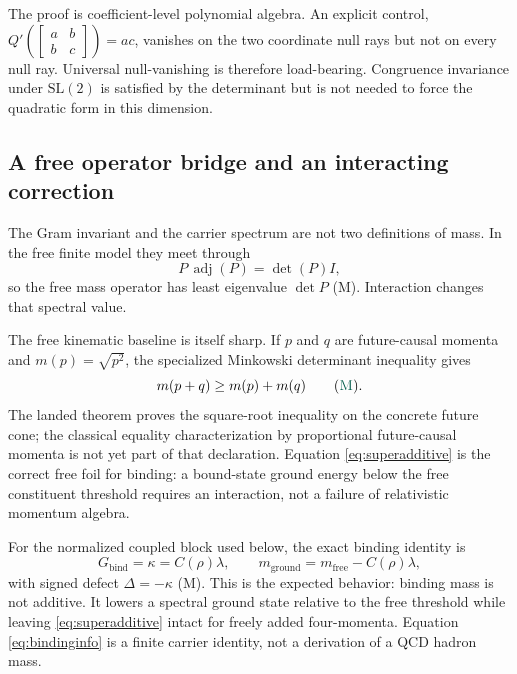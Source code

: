 \documentclass[11pt]{article}
\newcommand{\Mtag}{\textcolor{verified}{\textsc{M}}}
\begin{document}
The proof is coefficient-level polynomial algebra.  An explicit control,
$Q'(\left[\begin{smallmatrix}a&b\\b&c\end{smallmatrix}\right])=ac$, vanishes on
the two coordinate null rays but not on every null ray.  Universal
null-vanishing is therefore load-bearing.  Congruence invariance under
$\mathrm{SL}(2)$ is satisfied by the determinant but is not needed to force the
quadratic form in this dimension.

\subsection{A free operator bridge and an interacting correction}

The Gram invariant and the carrier spectrum are not two definitions of mass.
In the free finite model they meet through
\begin{equation}\label{eq:adjbridge}
  P\,\operatorname{adj}(P)=\det(P)I,
\end{equation}
so the free mass operator has least eigenvalue $\det P$ (\Mtag).  Interaction
changes that spectral value.

The free kinematic baseline is itself sharp.  If $p$ and $q$ are
future-causal momenta and $m(p)=\sqrt{p^2}$, the specialized Minkowski
determinant inequality gives
\begin{equation}\label{eq:superadditive}
 m(p+q)\geq m(p)+m(q)
 \qquad(\Mtag).
\end{equation}
The landed theorem proves the square-root inequality on the concrete future
cone; the classical equality characterization by proportional future-causal
momenta is not yet part of that declaration.  Equation
\eqref{eq:superadditive} is the correct free foil for binding: a bound-state
ground energy below the free constituent threshold requires an interaction,
not a failure of relativistic momentum algebra.

For the normalized coupled block used below,
the exact binding identity is
\begin{equation}\label{eq:bindinginfo}
  G_{\mathrm{bind}}=\kappa=C(\rho)\lambda,
  \qquad
  m_{\mathrm{ground}}=m_{\mathrm{free}}-C(\rho)\lambda,
\end{equation}
with signed defect $\Delta=-\kappa$ (\Mtag).  This is the expected behavior:
binding mass is not additive.  It lowers a spectral ground state relative to
the free threshold while leaving \eqref{eq:superadditive} intact for freely
added four-momenta.  Equation \eqref{eq:bindinginfo} is a finite carrier
identity, not a derivation of a QCD hadron mass.
\end{document}

